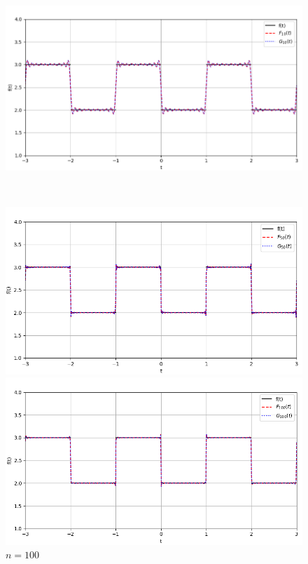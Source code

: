 \documentclass[a4paper]{article}
\begin{document}
\begin{figure}[H]
\begin{minipage}{0.5\textwidth}
        \caption{$n = 5$}
    \end{minipage}\hfill
    \begin{minipage}{0.5\textwidth}
        \centering \includegraphics[width=\textwidth]{square_wave/10.png}
        \caption{$n = 10$}
    \end{minipage}\\[1em]
    \begin{minipage}{0.5\textwidth}
        \centering \includegraphics[width=\textwidth]{square_wave/50.png}
        \caption{$n = 50$}
    \end{minipage}
    \begin{minipage}{0.5\textwidth}
        \centering \includegraphics[width=\textwidth]{square_wave/100.png}
        \caption{$n = 100$}
    \end{minipage}
\end{figure}\noindent\
\end{document}
